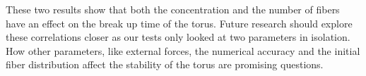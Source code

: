 These two results show that both the concentration and the number of fibers have an effect on the break up time of the torus. Future research should explore these correlations closer as our tests only looked at two parameters in isolation. How other parameters, like external forces, the numerical accuracy and the initial fiber distribution affect the stability of the torus are promising questions.
